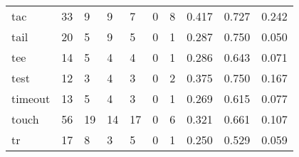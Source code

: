 \begin{longtable}{lp{1.3cm}p{1.3cm}p{1.3cm}p{1.3cm}p{1.3cm}p{1.3cm}p{1.3cm}p{1.3cm}p{1.3cm}}
tac       &                     33 &                                             9 &                                            9 &                                           7 &                                            0 &                                          8 &                                0.417 &                                  0.727 &                                0.242 \\
tail      &                     20 &                                             5 &                                            9 &                                           5 &                                            0 &                                          1 &                                0.287 &                                  0.750 &                                0.050 \\
tee       &                     14 &                                             5 &                                            4 &                                           4 &                                            0 &                                          1 &                                0.286 &                                  0.643 &                                0.071 \\
test      &                     12 &                                             3 &                                            4 &                                           3 &                                            0 &                                          2 &                                0.375 &                                  0.750 &                                0.167 \\
timeout   &                     13 &                                             5 &                                            4 &                                           3 &                                            0 &                                          1 &                                0.269 &                                  0.615 &                                0.077 \\
touch     &                     56 &                                            19 &                                           14 &                                          17 &                                            0 &                                          6 &                                0.321 &                                  0.661 &                                0.107 \\
tr        &                     17 &                                             8 &                                            3 &                                           5 &                                            0 &                                          1 &                                0.250 &                                  0.529 &                                0.059 \\

\end{longtable}
